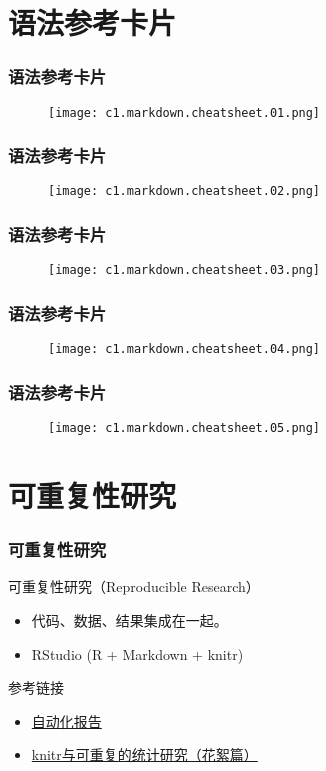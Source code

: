 \section{语法参考卡片}
\begin{frame}
  \frametitle{语法参考卡片}
  \begin{figure}
    \centering
    \texttt{[image: c1.markdown.cheatsheet.01.png]}
  \end{figure}
\end{frame}

\begin{frame}
  \frametitle{语法参考卡片}
  \begin{figure}
    \centering
    \texttt{[image: c1.markdown.cheatsheet.02.png]}
  \end{figure}
\end{frame}

\begin{frame}
  \frametitle{语法参考卡片}
  \begin{figure}
    \centering
    \texttt{[image: c1.markdown.cheatsheet.03.png]}
  \end{figure}
\end{frame}

\begin{frame}
  \frametitle{语法参考卡片}
  \begin{figure}
    \centering
    \texttt{[image: c1.markdown.cheatsheet.04.png]}
  \end{figure}
\end{frame}

\begin{frame}
  \frametitle{语法参考卡片}
  \begin{figure}
    \centering
    \texttt{[image: c1.markdown.cheatsheet.05.png]}
  \end{figure}
\end{frame}

\section{可重复性研究}
\begin{frame}
  \frametitle{可重复性研究}
  \begin{block}{可重复性研究（Reproducible Research）}
    \begin{itemize}
      \item 代码、数据、结果集成在一起。
      \item RStudio (R + Markdown + knitr)
    \end{itemize}
  \end{block}
  \pause
  \begin{block}{参考链接}
    \begin{itemize}
      \item \href{https://github.com/yihui/r-ninja/blob/master/11-auto-report.md}{自动化报告}
      \item \href{http://cos.name/2012/06/reproducible-research-with-knitr/}{knitr与可重复的统计研究（花絮篇）}
    \end{itemize}
  \end{block}
\end{frame}

